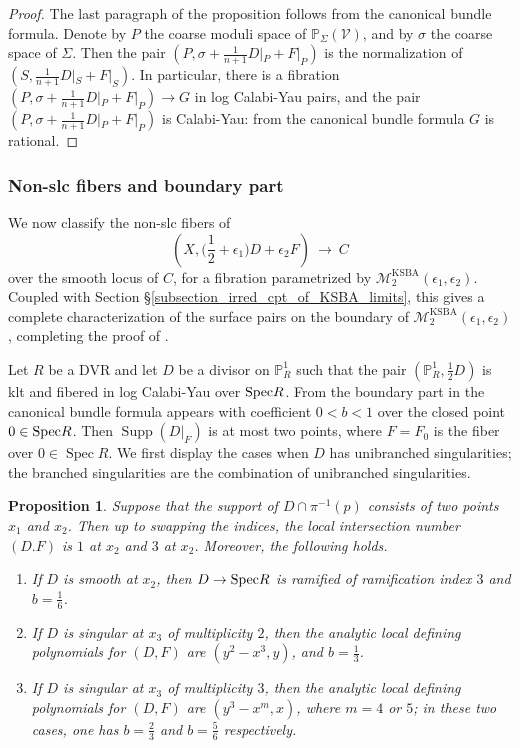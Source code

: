\documentclass[a4paper,12pt]{amsart}
\DeclareMathOperator{\Spec}{Spec}
\DeclareMathOperator{\Supp}{Supp}
\DeclareMathOperator{\KSBA}{\mathrm{KSBA}}
\newcommand{\bP}{{\mathbb P}}
\newcommand{\cV}{{\mathcal{V}}}
\newcommand\spec{\text{\rm Spec}}
\newcommand\cM{{\mathcal{M}}}
\newtheorem{prop}[theorem]{Proposition}
\theoremstyle{definition}
\theoremstyle{remark}
\begin{document}
\begin{proof}
   The last paragraph of the proposition follows from the canonical bundle formula.
   Denote by $P$ the coarse moduli space of $\bP_\Sigma(\cV)$, and by $\sigma$ the coarse space of $\Sigma$. Then the pair $(P,\sigma + \frac{1}{n+1}D|_P +F|_P)$ is the normalization of $(S,\frac{1}{n+1}D|_S+F|_S)$. In particular, there is a fibration $(P,\sigma + \frac{1}{n+1}D|_P+F|_P)\to G$ in log Calabi-Yau pairs, and the pair $(P,\sigma + \frac{1}{n+1}D|_P+F|_P)$ is Calabi-Yau: from the canonical bundle formula $G$ is rational. 
\end{proof}
\subsubsection{Non-slc fibers and boundary part}\label{sec:classification of fibers}
We now classify the non-slc fibers of $$\textstyle\left(X,\big(\frac{1}{2}+\epsilon_1)D+\epsilon_2F\right) \ \longrightarrow \ C$$
over the smooth locus of $C$, for a fibration
parametrized by $\cM^{\KSBA}_2(\epsilon_1,\epsilon_2)$.
Coupled with Section \S \ref{subsection_irred_cpt_of_KSBA_limits}, this gives a complete characterization of the surface pairs on the boundary of $\cM^{\KSBA}_2(\epsilon_1,\epsilon_2)$, completing the proof of .

   Let $R$ be a DVR and let $D$ be a divisor on $\bP^1_R$ such that the pair $(\bP^1_R,\frac{1}{2}D)$ is klt and fibered in log Calabi-Yau over $\spec R$. From  the boundary part in the canonical bundle formula appears with coefficient $0<b<1$ over the closed point $0\in\spec R$. Then $\Supp(D|_{F})$ is at most two points, where $F=F_0$ is the fiber over $0\in \Spec R$. We first display the cases when $D$ has unibranched singularities; the branched singularities are the combination of unibranched singularities.

   

\begin{prop}
  Suppose that the support of $D\cap \pi^{-1}(p)$ consists of two points $x_1$ and $x_2$. Then up to swapping the indices, the local intersection number $(D.F)$ is $1$ at $x_2$ and $3$ at $x_2$. Moreover, the following holds.
    \begin{enumerate}
        \item If $D$ is smooth at $x_2$, then $D\to \spec R$ is ramified of ramification index $3$ and $b=\frac{1}{6}$.
        \item If $D$ is singular at $x_3$ of multiplicity $2$, then the analytic local defining polynomials for $(D,F)$ are $(y^2-x^3,y)$, and $b=\frac{1}{3}$.
        \item If $D$ is singular at $x_3$ of multiplicity $3$, then the analytic local defining polynomials for $(D,F)$ are $(y^3-x^m,x)$, where $m=4$ or $5$; in these two cases, one has $b=\frac{2}{3}$ and $b=\frac{5}{6}$ respectively.
    \end{enumerate}
\end{prop}
\end{document}
